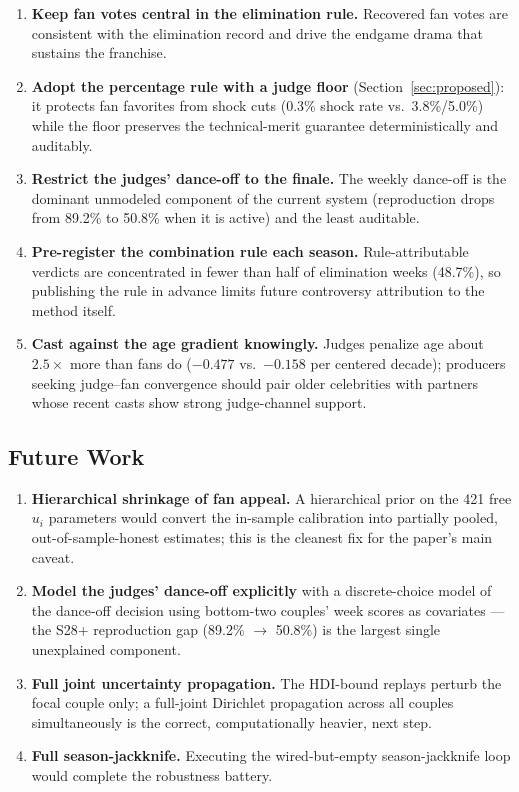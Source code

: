 \documentclass[10pt]{article}
\begin{document}
\begin{enumerate}[itemsep=1pt]
\item \textbf{Keep fan votes central in the elimination rule.} Recovered fan votes are
consistent with the elimination record and drive the endgame drama that sustains the
franchise.
\item \textbf{Adopt the percentage rule with a judge floor}
(Section~\ref{sec:proposed}): it protects fan favorites from shock cuts (0.3\% shock rate
vs.\ 3.8\%/5.0\%) while the floor preserves the technical-merit guarantee deterministically
and auditably.
\item \textbf{Restrict the judges' dance-off to the finale.} The weekly dance-off is the
dominant unmodeled component of the current system (reproduction drops from 89.2\% to
50.8\% when it is active) and the least auditable.
\item \textbf{Pre-register the combination rule each season.} Rule-attributable verdicts
are concentrated in fewer than half of elimination weeks (48.7\%), so publishing the rule
in advance limits future controversy attribution to the method itself.
\item \textbf{Cast against the age gradient knowingly.} Judges penalize age about
$2.5\times$ more than fans do ($-0.477$ vs.\ $-0.158$ per centered decade); producers
seeking judge--fan convergence should pair older celebrities with partners whose recent
casts show strong judge-channel support.
\end{enumerate}

\subsection{Future Work}

\begin{enumerate}[itemsep=1pt]
\item \textbf{Hierarchical shrinkage of fan appeal.} A hierarchical prior on the 421 free
$u_i$ parameters would convert the in-sample calibration into partially pooled,
out-of-sample-honest estimates; this is the cleanest fix for the paper's main caveat.
\item \textbf{Model the judges' dance-off explicitly} with a discrete-choice model of the
dance-off decision using bottom-two couples' week scores as covariates --- the S28+
reproduction gap (89.2\% $\to$ 50.8\%) is the largest single unexplained component.
\item \textbf{Full joint uncertainty propagation.} The HDI-bound replays perturb the focal
couple only; a full-joint Dirichlet propagation across all couples simultaneously is the
correct, computationally heavier, next step.
\item \textbf{Full season-jackknife.} Executing the wired-but-empty season-jackknife loop
would complete the robustness battery.
\end{enumerate}
\end{document}
